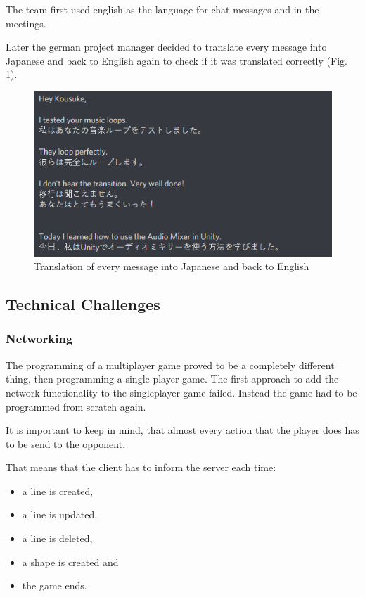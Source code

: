 The team first used english as the language for chat messages and in the meetings.

Later the german project manager decided to translate every message into Japanese and back to English again to check if it was translated correctly (Fig. \ref{fig:Translation}).

\begin{figure}[htbp]
	\centering
		\includegraphics[width=1.00\textwidth]{img/Translation.png}
	\caption[Translation of every message into Japanese and back to English]{Translation of every message into Japanese and back to English}
	\label{fig:Translation}
\end{figure}

\subsection{Technical Challenges}

\subsubsection{Networking}

The programming of a multiplayer game proved to be a completely different thing, then programming a single player game.
The first approach to add the network functionality to the singleplayer game failed. Instead the game had to be programmed from scratch again.

It is important to keep in mind, that almost every action that the player does has to be send to the opponent.

That means that the client has to inform the server each time:
\begin{itemize}
	\item a line is created,
	\item a line is updated,
	\item a line is deleted,
	\item a shape is created and
	\item the game ends.
\end{itemize}

